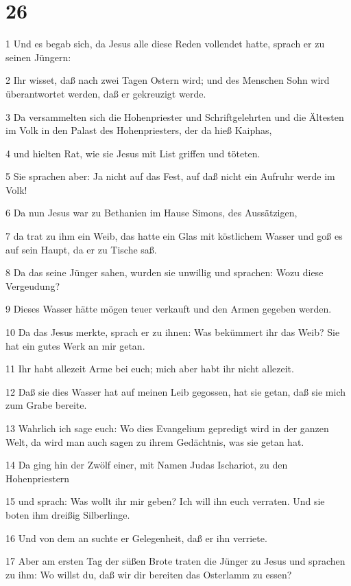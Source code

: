 \chapter{26}

\par 1 Und es begab sich, da Jesus alle diese Reden vollendet hatte, sprach er zu seinen Jüngern:
\par 2 Ihr wisset, daß nach zwei Tagen Ostern wird; und des Menschen Sohn wird überantwortet werden, daß er gekreuzigt werde.
\par 3 Da versammelten sich die Hohenpriester und Schriftgelehrten und die Ältesten im Volk in den Palast des Hohenpriesters, der da hieß Kaiphas,
\par 4 und hielten Rat, wie sie Jesus mit List griffen und töteten.
\par 5 Sie sprachen aber: Ja nicht auf das Fest, auf daß nicht ein Aufruhr werde im Volk!
\par 6 Da nun Jesus war zu Bethanien im Hause Simons, des Aussätzigen,
\par 7 da trat zu ihm ein Weib, das hatte ein Glas mit köstlichem Wasser und goß es auf sein Haupt, da er zu Tische saß.
\par 8 Da das seine Jünger sahen, wurden sie unwillig und sprachen: Wozu diese Vergeudung?
\par 9 Dieses Wasser hätte mögen teuer verkauft und den Armen gegeben werden.
\par 10 Da das Jesus merkte, sprach er zu ihnen: Was bekümmert ihr das Weib? Sie hat ein gutes Werk an mir getan.
\par 11 Ihr habt allezeit Arme bei euch; mich aber habt ihr nicht allezeit.
\par 12 Daß sie dies Wasser hat auf meinen Leib gegossen, hat sie getan, daß sie mich zum Grabe bereite.
\par 13 Wahrlich ich sage euch: Wo dies Evangelium gepredigt wird in der ganzen Welt, da wird man auch sagen zu ihrem Gedächtnis, was sie getan hat.
\par 14 Da ging hin der Zwölf einer, mit Namen Judas Ischariot, zu den Hohenpriestern
\par 15 und sprach: Was wollt ihr mir geben? Ich will ihn euch verraten. Und sie boten ihm dreißig Silberlinge.
\par 16 Und von dem an suchte er Gelegenheit, daß er ihn verriete.
\par 17 Aber am ersten Tag der süßen Brote traten die Jünger zu Jesus und sprachen zu ihm: Wo willst du, daß wir dir bereiten das Osterlamm zu essen?
